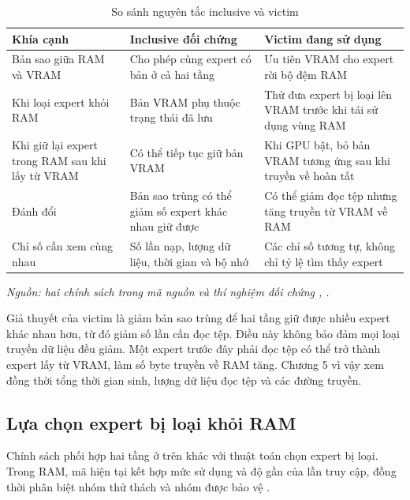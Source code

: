\begin{table}[htbp]
\centering
\caption{So sánh nguyên tắc inclusive và victim}
\small
\setlength{\tabcolsep}{3pt}
\begin{tabularx}{\textwidth}{>{\RaggedRight\arraybackslash}p{3.5cm} >{\RaggedRight\arraybackslash}p{4cm} >{\RaggedRight\arraybackslash}X}
\toprule
\textbf{Khía cạnh} & \textbf{Inclusive đối chứng} & \textbf{Victim đang sử dụng} \\
\midrule
Bản sao giữa RAM và VRAM & Cho phép cùng expert có bản ở cả hai tầng & Ưu tiên VRAM cho expert rời bộ đệm RAM \\
Khi loại expert khỏi RAM & Bản VRAM phụ thuộc trạng thái đã lưu & Thử đưa expert bị loại lên VRAM trước khi tái sử dụng vùng RAM \\
Khi giữ lại expert trong RAM sau khi lấy từ VRAM & Có thể tiếp tục giữ bản VRAM & Khi GPU bật, bỏ bản VRAM tương ứng sau khi truyền về hoàn tất \\
Đánh đổi & Bản sao trùng có thể giảm số expert khác nhau giữ được & Có thể giảm đọc tệp nhưng tăng truyền từ VRAM về RAM \\
Chỉ số cần xem cùng nhau & Số lần nạp, lượng dữ liệu, thời gian và bộ nhớ & Các chỉ số tương tự, không chỉ tỷ lệ tìm thấy expert \\
\bottomrule
\end{tabularx}

\textit{Nguồn: hai chính sách trong mã nguồn và thí nghiệm đối chứng \cite{moe_tierengine_arch}, \cite{exp_web_session_i5}.}
\end{table}



Giả thuyết của victim là giảm bản sao trùng để hai tầng giữ được nhiều expert khác nhau hơn, từ đó giảm số lần cần đọc tệp. Điều này không bảo đảm mọi loại truyền dữ liệu đều giảm. Một expert trước đây phải đọc tệp có thể trở thành expert lấy từ VRAM, làm số byte truyền về RAM tăng. Chương 5 vì vậy xem đồng thời tổng thời gian sinh, lượng dữ liệu đọc tệp và các đường truyền.

\subsection{Lựa chọn expert bị loại khỏi RAM}

Chính sách phối hợp hai tầng ở trên khác với thuật toán chọn expert bị loại. Trong RAM, mã hiện tại kết hợp mức sử dụng và độ gần của lần truy cập, đồng thời phân biệt nhóm thử thách và nhóm được bảo vệ \cite{moe_tierengine_arch}.

